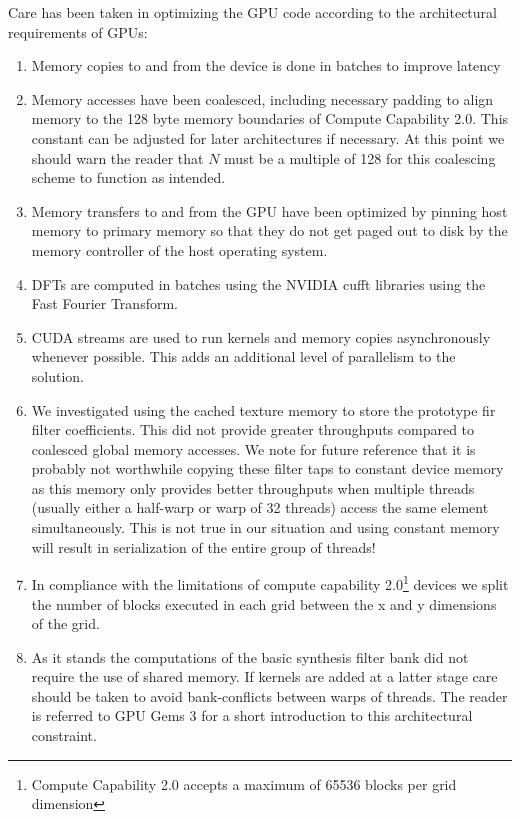 \documentclass[a4paper,10pt]{article}
\begin{document}
Care has been taken in optimizing the GPU code according to the architectural requirements of GPUs: 
\begin{enumerate}
 \item Memory copies to and from the device is done in batches to improve latency
 \item Memory accesses have been coalesced, including necessary padding to align memory to the 128 byte memory boundaries of Compute Capability 2.0. This constant 
 can be adjusted for later architectures if necessary. At this point we should warn the reader that $N$ must be a multiple of 128 for this coalescing scheme to function
 as intended.
 \item Memory transfers to and from the GPU have been optimized by pinning host memory to primary memory so that they do not get paged out to disk by the memory 
 controller of the host operating system.
 \item DFTs are computed in batches using the NVIDIA cufft libraries using the Fast Fourier Transform.
 \item CUDA streams are used to run kernels and memory copies asynchronously whenever possible. This adds an additional level of parallelism to the solution.
 \item We investigated using the cached texture memory to store the prototype \gls{fir} filter coefficients. This did not provide greater throughputs compared to
 coalesced global memory accesses. We note for future reference that it is probably not worthwhile copying these filter taps to constant device memory as this memory only provides
 better throughputs when multiple threads (usually either a half-warp or warp of 32 threads) access the same element simultaneously. This is not true in our situation and
 using constant memory will result in serialization of the entire group of threads!
 \item In compliance with the limitations of compute capability 2.0\footnote{Compute Capability 2.0 accepts a maximum of 65536 blocks per grid dimension} devices we split the 
 number of blocks executed in each grid between the x and y dimensions of the grid.
 \item As it stands the computations of the basic synthesis filter bank did not require the use of shared memory. If kernels are added at a latter stage care should be taken
 to avoid bank-conflicts between warps of threads. The reader is referred to GPU Gems 3 \cite[ch. 3]{harris2007parallel} for a short introduction to this architectural constraint.
\end{enumerate}
\end{document}
